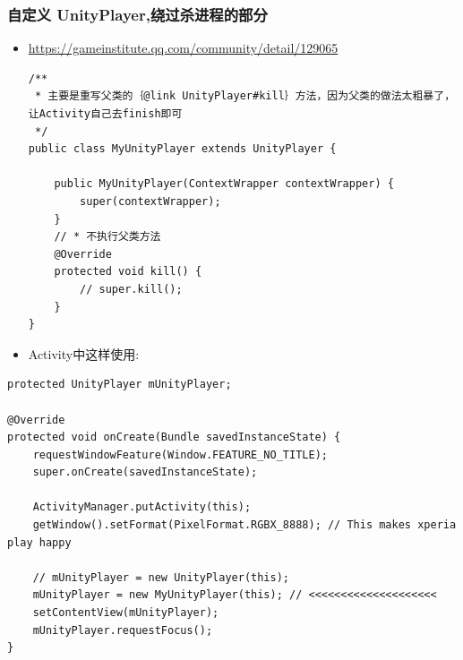 \documentclass[9pt, b5paper]{article}
\begin{document}
\subsubsection{自定义 UnityPlayer,绕过杀进程的部分}
\label{sec-1-2-1}
\begin{itemize}
\item \url{https://gameinstitute.qq.com/community/detail/129065}
\begin{verbatim}
/**
 * 主要是重写父类的｛@link UnityPlayer#kill｝方法，因为父类的做法太粗暴了，让Activity自己去finish即可
 */
public class MyUnityPlayer extends UnityPlayer {

    public MyUnityPlayer(ContextWrapper contextWrapper) {
        super(contextWrapper);
    }
    // * 不执行父类方法
    @Override
    protected void kill() {
        // super.kill();
    }
}
\end{verbatim}
\item Activity中这样使用:
\end{itemize}
\begin{verbatim}
protected UnityPlayer mUnityPlayer;

@Override
protected void onCreate(Bundle savedInstanceState) {
    requestWindowFeature(Window.FEATURE_NO_TITLE);
    super.onCreate(savedInstanceState);

    ActivityManager.putActivity(this);
    getWindow().setFormat(PixelFormat.RGBX_8888); // This makes xperia play happy

    // mUnityPlayer = new UnityPlayer(this); 
    mUnityPlayer = new MyUnityPlayer(this); // <<<<<<<<<<<<<<<<<<<< 
    setContentView(mUnityPlayer);
    mUnityPlayer.requestFocus();
}
\end{verbatim}
\end{document}
